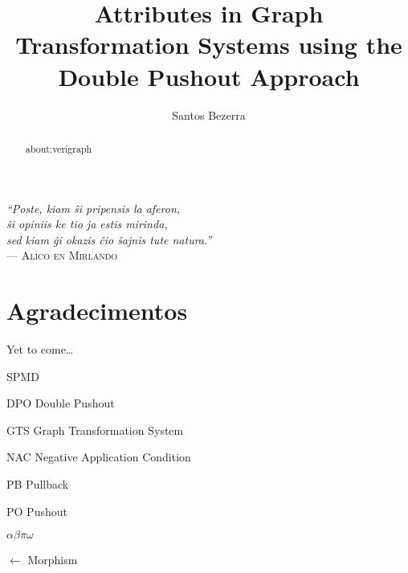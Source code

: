 \documentclass[ppgc,diss,english,openright]{iiufrgs}
\title{Attributes in Graph Transformation Systems using the Double Pushout Approach}
\author{Santos Bezerra}{Jonas}
\theoremstyle{plain}
\theoremstyle{definition}
\begin{document}
  \maketitle
  \clearpage

  \clearpage
  \begin{flushright}
    \mbox{}\vfill
    {\sffamily\itshape
    ``Poste, kiam \^si pripensis la aferon,\\
    \^si opiniis ke tio ja estis mirinda,\\
    sed kiam \^gi okazis \^cio \^sajnis tute natura.''\\}
    --- \textsc{Alico en Mirlando}
  \end{flushright}

  \chapter*{Agradecimentos}
  Yet to come\ldots
  
  \begin{abstract}
    about:verigraph
  \end{abstract}

  \begin{listofabbrv}{SPMD}
          \item[DPO] Double Pushout
          \item[GTS] Graph Transformation System
          \item[NAC] Negative Application Condition
          \item[PB] Pullback
          \item[PO] Pushout
  \end{listofabbrv}

  \begin{listofsymbols}{$\alpha\beta\pi\omega$}
         \item[$\leftarrow$] Morphism
  \end{listofsymbols}

  \listoffigures
  \tableofcontents

  
  
  
  
  
  
  
  
  
\end{document}
